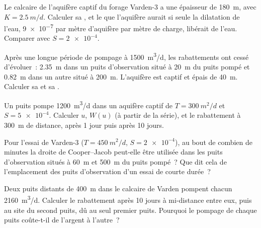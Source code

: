 \begin{exercise}[$\star$]\label{exo:b3:hydrogeology:4}
Le calcaire de l'aquifère captif du forage Varden-3 a une épaisseur de \qty{180}{m}, avec $K =
\qty{2.5}{m/d}$. Calculer sa , et le 
que l'aquifère aurait si seule la dilatation de l'eau, \num{9e-7} par mètre
d'aquifère par mètre de charge, libérait de l'eau. Comparer avec $S = \num{2e-4}$.
\end{exercise}

\begin{exercise}[$\star\star$]\label{exo:b3:hydrogeology:5}
Après une longue période de pompage à \qty{1500}{m^3/d}, les rabattements ont
cessé d'évoluer~: \qty{2.35}{m} dans un puits d'observation situé à \qty{20}{m} du
puits pompé et \qty{0.82}{m} dans un autre situé à \qty{200}{m}. L'aquifère est
captif et épais de \qty{40}{m}. Calculer sa  et sa
.
\end{exercise}

\begin{exercise}[$\star\star$]\label{exo:b3:hydrogeology:6}
Un puits pompe \qty{1200}{m^3/d} dans un aquifère captif de $T =
\qty{300}{m^2/d}$ et $S = \num{5e-4}$. Calculer $u$, $W(u)$ (à partir de la
série), et le rabattement à \qty{300}{m} de distance, après 1 jour puis après 10 jours.
\end{exercise}

\begin{exercise}[$\star\star$]\label{exo:b3:hydrogeology:7}
Pour l'essai de Varden-3 ($T = \qty{450}{m^2/d}$, $S = \num{2e-4}$), au bout de
combien de minutes la droite de Cooper--Jacob peut-elle être utilisée dans les puits
d'observation situés à \qty{60}{m} et \qty{500}{m} du puits pompé~? Que dit cela
de l'emplacement des puits d'observation d'un essai de courte durée~?
\end{exercise}

\begin{exercise}[$\star\star$]\label{exo:b3:hydrogeology:8}
Deux puits distants de \qty{400}{m} dans le calcaire de Varden pompent chacun
\qty{2160}{m^3/d}. Calculer le rabattement après 10 jours à mi-distance entre eux,
puis au site du second puits, dû au seul premier puits. Pourquoi le pompage de chaque puits
coûte-t-il de l'argent à l'autre~?
\end{exercise}

